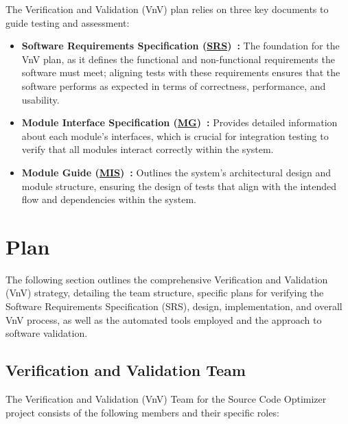 \documentclass[12pt, titlepage]{article}
\newcommand{\SRS}{\href{https://github.com/ssm-lab/capstone--source-code-optimizer/blob/main/docs/SRS/SRS.pdf}{SRS}}
\newcommand{\MG}{\href{https://github.com/ssm-lab/capstone--source-code-optimizer/blob/main/docs/Design/SoftArchitecture/MG.pdf}{MG}}
\newcommand{\MIS}{\href{https://github.com/ssm-lab/capstone--source-code-optimizer/blob/main/docs/Design/SoftDetailedDes/MIS.pdf}{MIS}}
\begin{document}
The Verification and Validation (VnV) plan relies on three key documents to guide testing and assessment: 
\begin{itemize}
  \item[] \textbf{Software Requirements Specification (\SRS)~\cite{SRS}:} The foundation for the VnV plan, as it defines the functional and non-functional requirements the software must meet; aligning tests with these requirements ensures that the software performs as expected in terms of correctness, performance, and usability.
  
  \item[] \textbf{Module Interface Specification (\MG)~\cite{MGDoc}:} Provides detailed information about each module's interfaces, which is crucial for integration testing to verify that all modules interact correctly within the system.
  
  \item[] \textbf{Module Guide (\MIS)~\cite{MISDoc}:} Outlines the system's architectural design and module structure, ensuring the design of tests that align with the intended flow and dependencies within the system.
\end{itemize}

\section{Plan}

The following section outlines the comprehensive Verification and Validation (VnV) strategy, detailing the team structure, specific plans for verifying the Software Requirements Specification (SRS), design, implementation, and overall VnV process, as well as the automated tools employed and the approach to software validation.

\subsection{Verification and Validation Team}

The Verification and Validation (VnV) Team for the Source Code Optimizer project consists of the following members and their specific roles:
\end{document}

